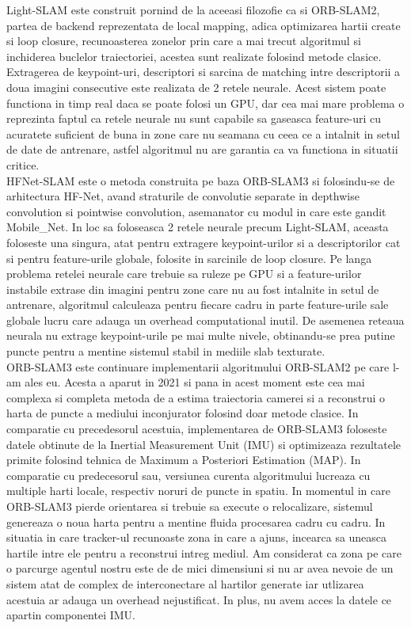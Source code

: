 \documentclass[12pt,a4paper]{report}
\begin{document}
Light-SLAM este construit pornind de la aceeasi filozofie ca si ORB-SLAM2, partea de backend
reprezentata de local mapping, adica optimizarea hartii create si loop closure, recunoasterea
zonelor prin care a mai trecut algoritmul si inchiderea buclelor traiectoriei, acestea sunt 
realizate folosind metode clasice. Extragerea de keypoint-uri, descriptori si sarcina de 
matching intre descriptorii a doua imagini consecutive este realizata de 2 retele neurale.
Acest sistem poate functiona in timp real daca se poate folosi un GPU, dar cea mai mare 
problema o reprezinta faptul ca retele neurale nu sunt capabile sa gaseasca feature-uri cu
acuratete suficient de buna in zone care nu seamana cu ceea ce a  intalnit in setul de date
 de antrenare, astfel algoritmul nu are garantia ca va functiona in situatii critice.\\

HFNet-SLAM este o metoda construita pe baza ORB-SLAM3 si folosindu-se de arhitectura HF-Net, 
avand straturile de convolutie separate in depthwise convolution si pointwise convolution, 
asemanator cu modul in care este gandit Mobile\_Net. In loc sa foloseasca 2 retele neurale 
precum Light-SLAM, aceasta foloseste una singura, atat pentru extragere keypoint-urilor si a
descriptorilor cat si pentru feature-urile globale, folosite in sarcinile de loop closure. 
Pe langa problema retelei neurale care trebuie sa ruleze pe GPU si a feature-urilor instabile 
extrase din imagini pentru zone care nu au fost intalnite in setul de antrenare, algoritmul
calculeaza pentru fiecare cadru in parte feature-urile sale globale lucru care adauga un 
overhead computational inutil. De asemenea reteaua neurala nu extrage keypoint-urile
pe mai multe nivele, obtinandu-se prea putine puncte pentru a mentine sistemul stabil 
in mediile slab texturate. \\

ORB-SLAM3 este continuare implementarii algoritmului ORB-SLAM2 pe care l-am ales eu.
Acesta a aparut in 2021 si pana in acest moment este cea mai complexa si completa metoda de a
estima traiectoria camerei si a reconstrui o harta de puncte a mediului inconjurator folosind 
doar metode clasice. In comparatie cu precedesorul acestuia, implementarea de ORB-SLAM3 foloseste
datele obtinute de la Inertial Measurement Unit (IMU) si optimizeaza rezultatele primite 
folosind tehnica de Maximum a Posteriori Estimation (MAP). In comparatie cu predecesorul 
sau, versiunea curenta algoritmului lucreaza cu multiple harti locale, respectiv noruri
de puncte in spatiu. In momentul in care ORB-SLAM3 pierde orientarea si trebuie sa execute 
o relocalizare, sistemul genereaza o noua harta pentru a mentine fluida procesarea cadru 
cu cadru. In situatia in care tracker-ul recunoaste zona in care a ajuns, incearca sa uneasca 
hartile intre ele pentru a reconstrui intreg mediul. Am considerat ca zona pe care o parcurge 
agentul nostru este de  de mici dimensiuni si nu ar avea nevoie de un sistem atat de 
complex de interconectare al hartilor generate iar utlizarea acestuia ar adauga un overhead
nejustificat. In plus, nu avem acces la datele ce apartin componentei IMU.\@ \\
\end{document}
